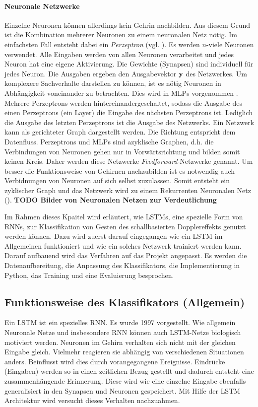 \paragraph{Neuronale Netzwerke}
Einzelne Neuronen können allerdings kein Gehrin nachbilden. Aus diesem Grund ist
die Kombination mehrerer Neuronen zu einem neuronalen Netz nötig. Im einfachsten
Fall entsteht dabei ein \textit{Perzeptron} (vgl.
\cite{rosenblatt58a,1165576}). Es werden $n$-viele Neuronen
verwendet. Alle Eingaben werden von allen Neuronen verarbeitet und jedes Neuron
hat eine eigene Aktivierung. Die Gewichte (Synapsen) sind individuell für jedes
Neuron. Die Ausgaben ergeben den Ausgabevektor $\bf{y}$ des Netzwerkes. Um
komplexere Sachverhalte darstellen zu können, ist es nötig Neuronen in Abhängigkeit
voneinander zu betrachten. Dies wird in \acp{MLP} vorgenommen \cite{1165576}.
Mehrere Perzeptrons werden hintereinandergeschaltet, sodass die Ausgabe des
einen Perzeptrons (ein Layer) die Eingabe des nächsten Perzeptrons ist.
Lediglich die Ausgabe des letzten Perzeptrons ist die Ausgabe des Netzwerks.
Ein Netzwerk kann als gerichteter Graph dargestellt werden. Die Richtung
entspricht dem Datenfluss. Perzeptrons und \acp{MLP} sind azyklische Graphen,
d.h. die Verbindungen von Neuronen gehen nur in Vorwärtsrichtung und bilden
somit keinen Kreis. Daher werden diese Netzwerke \textit{Feedforward}-Netzwerke
genannt. Um besser die Funktionsweise von Gehirnen nachzubilden ist es notwendig
auch Verbidnungen von Neuronen auf sich selbst zuzulassen. Somit entsteht ein
zyklischer Graph und das Netzwerk wird zu einem Rekurrenten Neuronalen Netz
().
\textbf{TODO Bilder von Neuronalen Netzen zur Verdeutlichung}

Im Rahmen dieses Kpaitel wird erläutert, wie \acsp{LSTM}, eine spezielle Form
von \acp{RNN}, zur Klassifikation von Gesten des schallbasierten Dopplereffekts
genutzt werden können. Dazu wird zuerst darauf eingegangen wie ein \ac{LSTM} im
Allgemeinen funktioniert und wie ein solches Netzwerk trainiert werden kann.
Darauf aufbauend wird das Verfahren auf das Projekt angepasst. Es werden die
Datenaufbereitung, die Anpassung des Klassifikators, die Implementierung in
Python, das Training und eine Evaluierung besprochen.


\subsection{Funktionsweise des Klassifikators (Allgemein)}

Ein \acl{LSTM} ist ein spezielles \ac{RNN}. Es wurde 1997
vorgestellt\cite{Hochreiter:1997}. Wie allgemein Neuronale Netze und
insbesondere \ac{RNN} können auch \ac{LSTM}-Netze biologisch motiviert werden.
Neuronen im Gehirn verhalten sich nicht mit der gleichen Eingabe gleich.
Vielmehr reagieren sie abhängig von verschiedenen Situationen anders. Beinflusst
wird dies durch vorangegangene Ereignisse. Eindrücke (Eingaben) werden so in
einen zeitlichen Bezug gestellt und dadurch entsteht eine zusammenhängende
Erinnerung. Diese wird wie eine einzelne Eingabe ebenfalls generalisiert in den
Synapsen und Neuronen gespeichert. Mit Hilfe der \ac{LSTM} Architektur wird
versucht dieses Verhalten nachzuahmen. 

